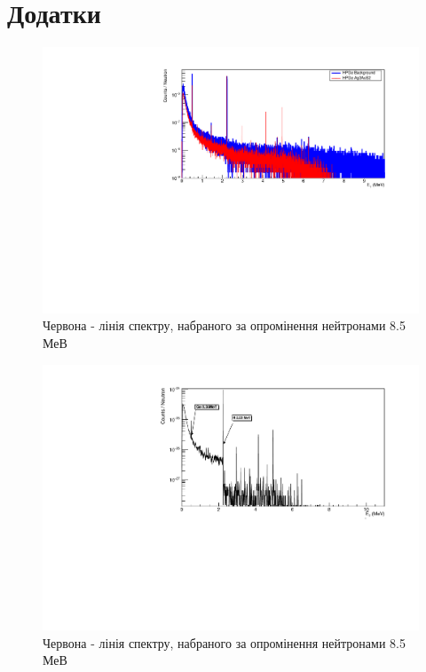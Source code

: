 \documentclass[a4paper, 14pt]{article}
\numberwithin{equation}{section}
\numberwithin{table}{section}
\begin{document}
	
	\newpage 
	\section{Додатки}
	\setcounter{figure}{0}
	\begin{figure}[h!]
		\centering \includegraphics[width=1\textwidth]{res/Ag3AuS2_8_5MeVFonClasic.pdf}
		\caption{Червона - лінія спектру, набраного за опромінення нейтронами 8.5 МеВ}
		\label{ris:Ag3AuS28_5MeV}	
	\end{figure} 
	\begin{figure}[h!]
		\centering \includegraphics[width=1\textwidth]{res/AuAgS28MeV.pdf}
		\caption{Червона - лінія спектру, набраного за опромінення нейтронами 8.5 МеВ}
		\label{ris:Ag3AuS22_8MeV}	
	\end{figure}
\end{document}
